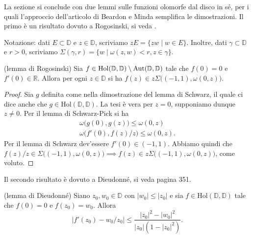 La sezione si conclude con due lemmi sulle funzioni olomorfe dal disco in sé, per i quali l'approccio dell'articolo di Beardon e Minda semplifica le dimostrazioni. Il primo è un risultato dovuto a Rogosinski, si veda \cite{R}.

Notazione: dati $E \subset \mathbb{D}$ e $z \in \mathbb{D}$, scriviamo $zE=\{zw \mid w \in E\}$. Inoltre, dati $\gamma \subset \mathbb{D}$ e $r>0$, scriviamo $\Sigma(\gamma,r)=\{w \mid \omega(z,w)<r, z \in \gamma\}$.

\begin{lm}
  (lemma di Rogosinski) Sia $f \in \normalfont{\text{Hol}}(\mathbb{D},\mathbb{D})\setminus\normalfont{\text{Aut}}(\mathbb{D},\mathbb{D})$ tale che $f(0)=0$ e $f'(0) \in \mathbb{R}$. Allora per ogni $z \in \mathbb{D}$ si ha $f(z) \in z\Sigma\bigl((-1,1),\omega(0,z)\bigr)$.
\end{lm}

\begin{proof}
  Sia $g$ definita come nella dimostrazione del lemma di Schwarz, il quale ci dice anche che $g \in \text{Hol}(\mathbb{D},\mathbb{D})$. La tesi è vera per $z=0$, supponiamo dunque $z\not=0$. Per il lemma di Schwarz-Pick si ha
  \begin{gather*}
    \omega\bigl(g(0),g(z)\bigr) \le \omega(0,z) \\
    \omega\bigl(f'(0),f(z)/z\bigr) \le \omega(0,z).
  \end{gather*}
  Per il lemma di Schwarz dev'essere $f'(0) \in (-1,1)$. Abbiamo quindi che $f(z)/z \in \Sigma\bigl((-1,1),\omega(0,z)\bigr) \implies f(z) \in z\Sigma\bigl((-1,1),\omega(0,z)\bigr)$, come voluto.
\end{proof}

Il secondo risultato è dovuto a Dieudonné, si veda \cite{D} pagina 351.

\begin{lm}
  (lemma di Dieudonné) Siano $z_0,w_0 \in \mathbb{D}$ con $|w_0| \le |z_0|$ e sia $f \in \text{Hol}(\mathbb{D},\mathbb{D})$ tale che $f(0)=0$ e $f(z_0)=w_0$. Allora
  \begin{equation}
    |f'(z_0)-w_0/z_0| \le \frac{|z_0|^2-|w_0|^2}{|z_0|(1-|z_0|^2)}.
  \end{equation}
\end{lm}


